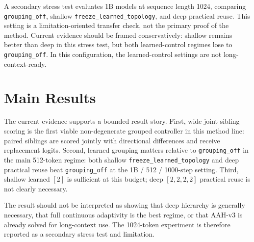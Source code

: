 \documentclass[11pt]{article}
\begin{document}
A secondary stress test evaluates 1B models at sequence length 1024, comparing \texttt{grouping\_off}, shallow \texttt{freeze\_learned\_topology}, and deep practical reuse. This setting is a limitation-oriented transfer check, not the primary proof of the method. Current evidence should be framed conservatively: shallow remains better than deep in this stress test, but both learned-control regimes lose to \texttt{grouping\_off}. In this configuration, the learned-control settings are not long-context-ready.

\section{Main Results}

The current evidence supports a bounded result story. First, wide joint sibling scoring is the first viable non-degenerate grouped controller in this method line: paired siblings are scored jointly with directional differences and receive replacement logits. Second, learned grouping matters relative to \texttt{grouping\_off} in the main 512-token regime: both shallow \texttt{freeze\_learned\_topology} and deep practical reuse beat \texttt{grouping\_off} at the 1B / 512 / 1000-step setting. Third, shallow learned \([2]\) is sufficient at this budget; deep \([2,2,2,2]\) practical reuse is not clearly necessary.

The result should not be interpreted as showing that deep hierarchy is generally necessary, that full continuous adaptivity is the best regime, or that AAH-v3 is already solved for long-context use. The 1024-token experiment is therefore reported as a secondary stress test and limitation.

\begin{table}[ht]
  \centering
  \caption{Main comparison structure for the final AAH-v3 experiments. The main table is restricted to pure baseline, \texttt{grouping\_off}, shallow freeze, and deep practical reuse, and includes post-warmup throughput to expose the practical tradeoff. Numerical values should be filled only from the finalized result bundle.}
  \label{tab:main_regimes}
\end{table}
\end{document}
